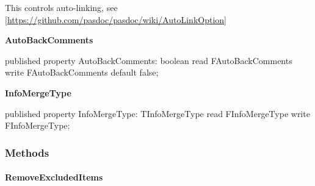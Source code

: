 \documentclass{report}
\newif\ifpdf
\begin{document}
\begin{list}{}
\begin{flushleft}
\ifpdf
\end{flushleft}
\fi


\par This controls auto{-}linking, see [\href{https://github.com/pasdoc/pasdoc/wiki/AutoLinkOption}{https://github.com/pasdoc/pasdoc/wiki/AutoLinkOption}]\label{PasDoc_Base.TPasDoc-AutoBackComments}
\item[\textbf{AutoBackComments}\hfill]
\ifpdf
\begin{flushleft}
\fi
\begin{ttfamily}
published property AutoBackComments: boolean
      read FAutoBackComments write FAutoBackComments default false;\end{ttfamily}

\ifpdf
\end{flushleft}
\fi


\par  \label{PasDoc_Base.TPasDoc-InfoMergeType}
\item[\textbf{InfoMergeType}\hfill]
\ifpdf
\begin{flushleft}
\fi
\begin{ttfamily}
published property InfoMergeType: TInfoMergeType
      read FInfoMergeType write FInfoMergeType;\end{ttfamily}

\ifpdf
\end{flushleft}
\fi


\par  \end{list}
\subsubsection*{\large{\textbf{Methods}}\normalsize\hspace{1ex}\hfill}
\paragraph*{RemoveExcludedItems}\hspace*{\fill}
\end{document}
